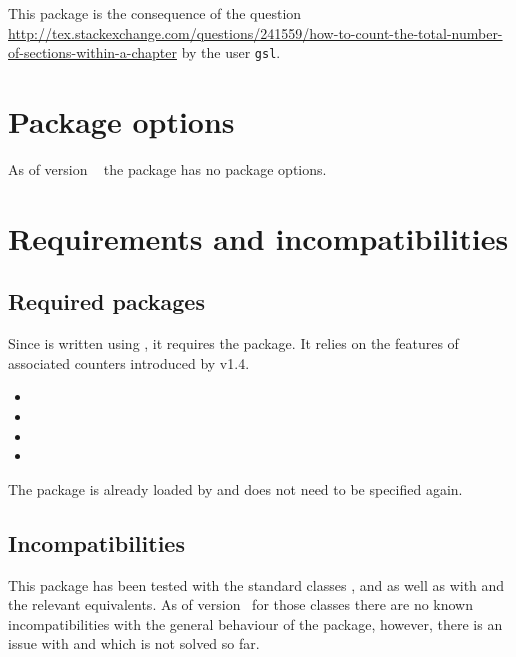 \documentclass[12pt,a4paper]{article}
\newcommand{\PackageDocName}{xcntperchap}%
\def\packageversion{\xcntperchappackageversion}%
\begin{document}
This package is the consequence of the question \url{http://tex.stackexchange.com/questions/241559/how-to-count-the-total-number-of-sections-within-a-chapter} by the user \texttt{gsl}. 



\section{Package options}%
\label{section::package_options}

As of version \packageversion~ the package has no package options.


\section{Requirements and incompatibilities}%

\subsection{Required packages}

Since \CHDocPackage{\PackageDocName} is written using , it requires the  package. It relies on the features of associated counters introduced by  v1.4. 

\begin{itemize}
\item {}%
\item {}%
\item {}%
\item {}%
\end{itemize}

The package  is already loaded by  and does not need to be specified again. 

\subsection{Incompatibilities}

This package has been tested with the standard classes ,  and  as well as with  and the relevant  equivalents. As of version \packageversion\ for those classes there are no known incompatibilities with the general behaviour of the package, however, there is an issue with  and  which is not solved so far. 
\end{document}
